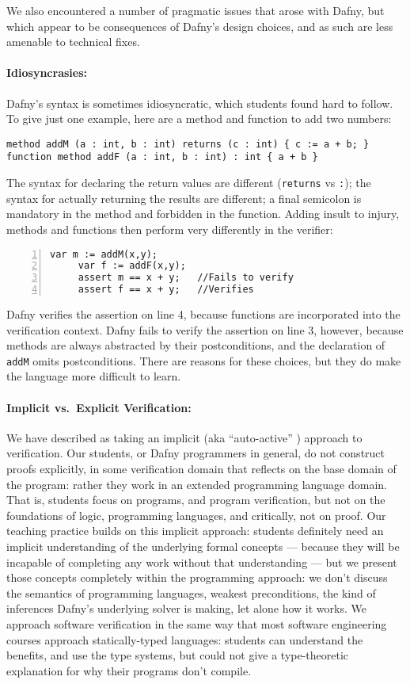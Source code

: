 We also encountered a number of pragmatic issues that arose with Dafny, but which appear to be consequences of Dafny's design choices, and as such are less amenable to technical fixes.

\paragraph{Idiosyncrasies:}  Dafny's syntax is sometimes idiosyncratic, which students found hard to follow.  
To give just one example, here are a method and function to add two numbers:
\begin{lstlisting}
method addM (a : int, b : int) returns (c : int) { c := a + b; }
function method addF (a : int, b : int) : int { a + b }
\end{lstlisting}
The syntax for declaring the return values are different
(\lstinline+returns+ vs \lstinline+:+); the syntax for actually returning the results are different; a final semicolon is mandatory in the method and forbidden in the function. 
Adding insult to injury, methods and functions then perform very differently in the verifier:
\begin{lstlisting}[numbers=left,stepnumber=1]
     var m := addM(x,y);
     var f := addF(x,y);
     assert m == x + y;   //Fails to verify
     assert f == x + y;   //Verifies
\end{lstlisting}
Dafny verifies the assertion on line 4, because functions are incorporated into the verification context.
Dafny fails to verify the assertion on line 3, however,
because methods are always abstracted by their postconditions,
and the declaration of \lstinline+addM+ omits postconditions.
There are reasons for these choices, but they do make the language more difficult to learn.  

\paragraph{Implicit vs.\ Explicit Verification:}  We have described as taking an implicit (aka ``auto-active''  \cite{autoactive2010}) approach to verification. 
Our students, or Dafny programmers in general, 
do not construct proofs explicitly, in some verification domain that reflects on the base domain of the program: rather they
work in an extended programming language domain. 
That is, students focus on programs, and program verification, but not on the foundations of logic, programming languages, and critically, not on proof.  Our teaching practice 
builds on this implicit approach: students 
definitely need an implicit understanding of the 
underlying formal concepts --- because they
will be incapable of completing 
any work without that understanding --- but we present 
those concepts completely within the programming 
approach: we don't discuss the semantics 
of programming languages, weakest preconditions, 
the kind of inferences Dafny's underlying solver is making,
let alone how it works.
We approach software verification in
the same way that most software engineering courses 
approach statically-typed languages: students can
understand the benefits, and use the type systems,
but could not give a type-theoretic explanation
for why their programs don't compile.

